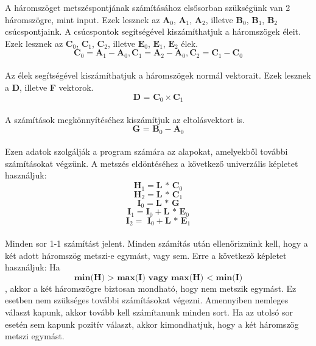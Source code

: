 
A háromszöget metszéspontjának számításához elsősorban szükségünk van 2 háromszögre, mint input. Ezek lesznek az $\textbf{A}_0$, $\textbf{A}_1$, $\textbf{A}_2$, illetve $\textbf{B}_0$, $\textbf{B}_1$, $\textbf{B}_2$ csúcspontjaink. A csúcspontok segítségével kiszámíthatjuk a háromszögek éleit. Ezek lesznek az $\textbf{C}_0$, $\textbf{C}_1$, $\textbf{C}_2$, illetve $\textbf{E}_0$, $\textbf{E}_1$, $\textbf{E}_2$ élek. \\
$$\textbf{C}_0 = \textbf{A}_1 - \textbf{A}_0, \textbf{C}_1 = \textbf{A}_2 - \textbf{A}_0, \textbf{C}_2 = \textbf{C}_1 - \textbf{C}_0$$\\
Az élek segítségével kiszámíthatjuk a háromszögek normál vektorait. Ezek lesznek a \textbf{D}, illetve \textbf{F} vektorok.  \\
$$\textbf{D = C}_0 \times \textbf{C}_1$$\\
A számítások megkönnyítéséhez kiszámítjuk az eltolásvektort is.  \\
$$\textbf{G = B}_0 -\textbf{A}_0$$\\
Ezen adatok szolgálják a program számára az alapokat, amelyekből további számításokat végzünk. A metszés eldöntéséhez a következő univerzális képletet használjuk: 
$$\textbf{H}_1 = \textbf{L * C}_0$$
$$\textbf{H}_2 = \textbf{L * C}_1$$
$$\textbf{I}_0 = \textbf{L * G}$$
$$\textbf{I}_1 = \textbf{I}_0 + \textbf{L * E}_0$$
$$\textbf{I}_2 =\textbf{ I}_0 + \textbf{L * E}_1$$
\\
Minden sor 1-1 számítást jelent. Minden számítás után ellenőriznünk kell, hogy a két adott háromszög metszi-e egymást, vagy sem. Erre a következő képletet használjuk: Ha\\
$$\textbf{min(H) > max(I) vagy max(H) < min(I)}$$, akkor a két háromszögre biztosan mondható, hogy nem metszik egymást. Ez esetben nem szükséges további számításokat végezni. Amennyiben nemleges választ kapunk, akkor tovább kell számítanunk minden sort. Ha az utolsó sor esetén sem kapunk pozitív választ, akkor kimondhatjuk, hogy a két háromszög metszi egymást.

